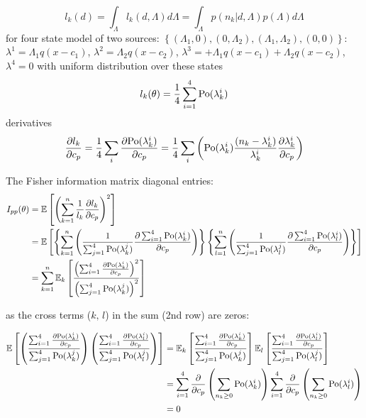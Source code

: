 \begin{equation}
	l_k(d)=\int_{\Lambda}l_k(d,\Lambda)d\Lambda=\int_{\Lambda}p(n_k|d,\Lambda)p(\Lambda)d\Lambda
\end{equation}
%
for four state model of two sources: $\left\{ (\Lambda_1,0),(0,\Lambda_2),(\Lambda_1,\Lambda_2),(0,0)\right\} $: $\lambda^1=\Lambda_1q(x-c_1)$, $\lambda^2=\Lambda_2q(x-c_2)$, $\lambda^3=+\Lambda_1q(x-c_1)+\Lambda_2q(x-c_2)$, $\lambda^4=0$ with uniform distribution over these states
%
\begin{equation}
	l_k(\theta)=\frac{1}{4}\sum_{i=1}^4\mathrm{Po}(\lambda_k^i)
\end{equation}
%
derivatives 
%
\begin{equation}
	\frac{\partial l_k}{\partial c_p}=\frac{1}{4}\sum_i\frac{\partial\mathrm{Po}(\lambda_k^i)}{\partial c_p}=\frac{1}{4}\sum_i\left(\mathrm{Po}(\lambda_k^i)\frac{(n_k-\lambda_k^i)}{\lambda_k^i}\frac{\partial\lambda_k^i}{\partial c_p}\right)
\end{equation}

The Fisher information matrix diagonal entries:
%
\begin{alignat}{1}
	I_{pp}(\theta) 
	& =\mathbb{E}\left[\left(\sum_{k=1}^n\frac{1}{l_k}\frac{\partial l_k}{\partial c_p}\right)^2\right]\nonumber \\
	& =\mathbb{E}\left[\left\{ \sum_{k=1}^n\left(\frac{1}{\sum_{j=1}^4\mathrm{Po}(\lambda_k^j)}\frac{\partial\sum_{i=1}^4\mathrm{Po}(\lambda_k^i)}{\partial c_p}\right)\right\} \left\{ \sum_{l=1}^n\left(\frac{1}{\sum_{j=1}^4\mathrm{Po}(\lambda_l^j)}\frac{\partial\sum_{i=1}^4\mathrm{Po}(\lambda_l^i)}{\partial c_p}\right)\right\} \right]\nonumber \\
	& =\sum_{k=1}^n\mathbb{E}_k\left[\frac{\left(\sum_{i=1}^4\frac{\partial\mathrm{Po}(\lambda_k^i)}{\partial c_p}\right)^2}{\left(\sum_{j=1}^4\mathrm{Po}(\lambda_k^j)\right)^2}\right]	 
	 \label{eq:Fisher Info Integrated Out - diagonal entries}
\end{alignat}

as the cross terms ($k,\, l$) in the sum (2nd row) are zeros: 

\begin{alignat*}{1}
	\mathbb{E}\left[\left(\frac{\sum_{i=1}^4\frac{\partial\mathrm{Po}(\lambda_k^i)}{\partial c_p}}{\sum_{j=1}^4\mathrm{Po}(\lambda_k^j)}\right)\left(\frac{\sum_{i=1}^4\frac{\partial\mathrm{Po}(\lambda_l^i)}{\partial c_p}}{\sum_{j=1}^4\mathrm{Po}(\lambda_l^j)}\right)\right] 
	& =\mathbb{E}_k\left[\frac{\sum_{i=1}^4\frac{\partial\mathrm{Po}(\lambda_k^i)}{\partial c_p}}{\sum_{j=1}^4\mathrm{Po}(\lambda_k^j)}\right]\mathbb{E}_l\left[\frac{\sum_{i=1}^4\frac{\partial\mathrm{Po}(\lambda_l^i)}{\partial c_p}}{\sum_{j=1}^4\mathrm{Po}(\lambda_l^j)}\right]\\
	& =\sum_{i=1}^4\frac{\partial}{\partial c_p}\left(\sum_{n_k\geq0}\mathrm{Po}(\lambda_k^i)\right)\sum_{i=1}^4\frac{\partial}{\partial c_p}\left(\sum_{n_k\geq0}\mathrm{Po}(\lambda_l^i)\right)\\
	& =0	
\end{alignat*}

